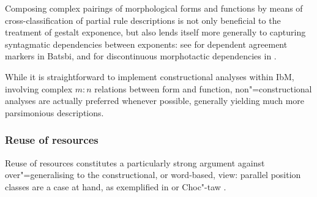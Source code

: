 \documentclass[output=paper,biblatex,babelshorthands,newtxmath,draftmode,colorlinks,citecolor=brown]{langscibook}
\begin{document}
\begin{exe}
\begin{xlist}
\begin{exe}
\begin{xlist}
Composing complex pairings of morphological forms and functions by
means of cross-classification of partial rule descriptions is not only
beneficial to the treatment of gestalt exponence, but also lends
itself more generally to capturing syntagmatic dependencies between
exponents: see \citet{Crysmann:2018:Batsbi} for dependent agreement
markers in Batsbi, and \citet{Crysmann:2020:LeL} for discontinuous
morphotactic dependencies in .

\largerpage
\begin{sloppypar}
  While it is straightforward to implement constructional analyses
  within IbM, involving complex $m:n$ relations between form and
  function, non"=constructional analyses are actually preferred
  whenever possible, generally yielding much more parsimonious
  descriptions.
\end{sloppypar}

\subsubsection{Reuse of resources}

Reuse of resources constitutes a particularly strong argument
against over"=generalising to the constructional, or word-based, view: parallel
position classes are a case at hand, as exemplified in 
\citep{Stump93,Crysmann:Bonami:2016} or Choc"-taw \citep{broadwell:2017}. 


\end{xlist}
\end{exe}
\end{xlist}
\end{exe}
\end{document}
